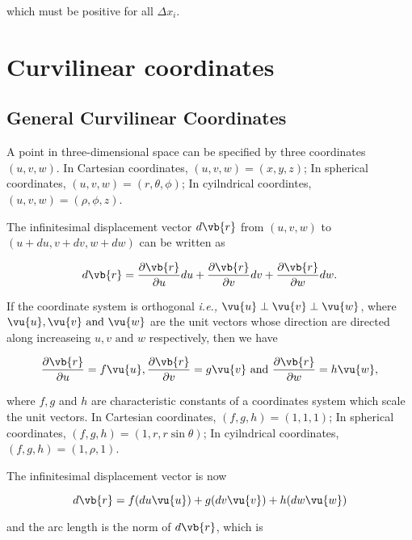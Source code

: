\documentclass[english,a4paper,12pt]{report}
\begin{document}
which must be positive for all \(\Delta x_{i} \).

\section{Curvilinear coordinates}

\subsection{General Curvilinear Coordinates}

A point in three-dimensional space can be specified by three coordinates \((u,v,w)\). In Cartesian coordinates, \((u,v,w) = (x,y,z)\); In spherical coordinates, \((u,v,w) = (r, \theta, \phi)\); In cyilndrical coordintes, \((u,v,w) = (\rho, \phi, z)\). 

The infinitesimal displacement vector \(d \vb{r} \)  from \((u,v,w)\) to \((u+du, v+dv, w+dw)\) can be written as

\begin{equation} 
	d\vb{r} = \frac{\partial \vb{r} }{\partial u} du + \frac{\partial \vb{r} }{\partial v}dv + \frac{\partial \vb{r} }{\partial w}dw. 
\end{equation}

If the coordinate system is orthogonal \textit{i.e.,} \(\vu{u} \perp \vu{v} \perp \vu{w}\), where \(\vu{u} ,\vu{v} \text { and } \vu{w} \) are the unit vectors whose direction are directed along increaseing \(u, v \text { and } w\) respectively, then we have

\begin{equation}
    \frac{\partial \vb{r} }{\partial u} = f \vu{u}, \frac{\partial \vb{r} }{\partial v} = g \vu{v}  \text { and } \frac{\partial \vb{r} }{\partial w} = h \vu{w}  ,
\end{equation}

where \(f,g\) and \(h\) are characteristic constants of a coordinates system which scale the unit vectors. In Cartesian coordinates, \((f,g,h) = (1,1,1)\); In spherical coordinates, \((f,g,h) = (1,r,r\sin{\theta})\); In cyilndrical coordinates, \((f,g,h) = (1,\rho ,1)\).
	
The infinitesimal displacement vector is now 

\begin{equation}
    d \vb{r} = f(du\vu{u}) + g(dv\vu{v}) + h(dw\vu{w}) \label{dl} 
\end{equation}

and the arc length is the norm of \(d \vb{r} \), which is 
\end{document}
